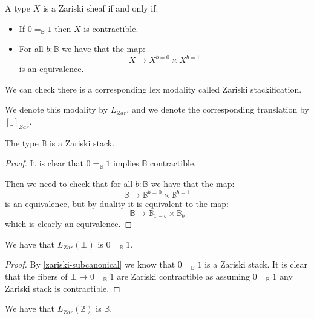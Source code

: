 \begin{definition}\label{zariski-characterisation}
A type $X$ is a Zariski sheaf if and only if:
\begin{itemize}
\item If $0=_\mathbb{B}1$ then $X$ is contractible.
\item For all $b:\mathbb{B}$ we have that the map:
\[X\to X^{b=0}\times X^{b=1}\]
is an equivalence.
\end{itemize}
\end{definition}

We can check there is a corresponding lex modality called Zariski stackification. 


We denote this modality by $L_{Zar}$, and we denote the corresponding translation by $[\_]_{Zar}$.

\begin{lemma}\label{zariski-subcanonical}
The type $\mathbb{B}$ is a Zariski stack.
\end{lemma}

\begin{proof}
It is clear that $0=_\mathbb{B}1$ implies $\mathbb{B}$ contractible.

Then we need to check that for all $b:\mathbb{B}$ we have that the map:
\[\mathbb{B} \to \mathbb{B}^{b=0}\times\mathbb{B}^{b=1}\]
is an equivalence, but by duality it is equivalent to the map:
\[\mathbb{B} \to \mathbb{B}_{1-b}\times\mathbb{B}_b\]
which is clearly an equivalence.
\end{proof}

\begin{lemma}\label{bot-zariski}
We have that $L_{Zar}(\bot)$ is $0=_\mathbb{B}1$.
\end{lemma}

\begin{proof}
By \cref{zariski-subcanonical} we know that $0=_\mathbb{B}1$ is a Zariski stack. It is clear that the fibers of $\bot\to 0=_\mathbb{B}1$ are Zariski contractible as assuming $0=_\mathbb{B}1$ any Zariski stack is contractible.
\end{proof}

\begin{lemma}\label{bool-zariski}
We have that $L_{Zar}(\mathbb{2})$ is $\mathbb{B}$.
\end{lemma}


